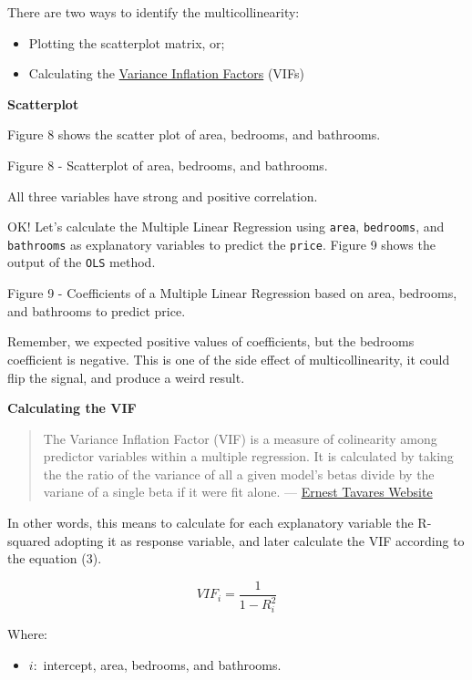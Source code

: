 \documentclass[]{book}
\providecommand{\tightlist}{%
  \setlength{\itemsep}{0pt}\setlength{\parskip}{0pt}}
\begin{document}
There are two ways to identify the multicollinearity:

\begin{itemize}
\tightlist
\item
  Plotting the scatterplot matrix, or;
\item
  Calculating the
  \href{https://en.wikipedia.org/wiki/Variance_inflation_factor}{Variance
  Inflation Factors} (VIFs)
\end{itemize}

\textbf{Scatterplot}

Figure 8 shows the scatter plot of area, bedrooms, and bathrooms.

Figure 8 - Scatterplot of area, bedrooms, and bathrooms.

All three variables have strong and positive correlation.

OK! Let's calculate the Multiple Linear Regression using \texttt{area},
\texttt{bedrooms}, and \texttt{bathrooms} as explanatory variables to
predict the \texttt{price}. Figure 9 shows the output of the
\texttt{OLS} method.

Figure 9 - Coefficients of a Multiple Linear Regression based on area,
bedrooms, and bathrooms to predict price.

Remember, we expected positive values of coefficients, but the bedrooms
coefficient is negative. This is one of the side effect of
multicollinearity, it could flip the signal, and produce a weird result.

\textbf{Calculating the VIF}

\begin{quote}
The Variance Inflation Factor (VIF) is a measure of colinearity among
predictor variables within a multiple regression. It is calculated by
taking the the ratio of the variance of all a given model's betas divide
by the variane of a single beta if it were fit alone. ---
\href{https://etav.github.io/python/vif_factor_python.html}{Ernest
Tavares Website}
\end{quote}

In other words, this means to calculate for each explanatory variable
the R-squared adopting it as response variable, and later calculate the
VIF according to the equation (3).

\[VIF_i = \frac{1}{1-R^2_i} \tag{3}\]

Where:

\begin{itemize}
\tightlist
\item
  \(i:\) intercept, area, bedrooms, and bathrooms.
\end{itemize}
\end{document}
